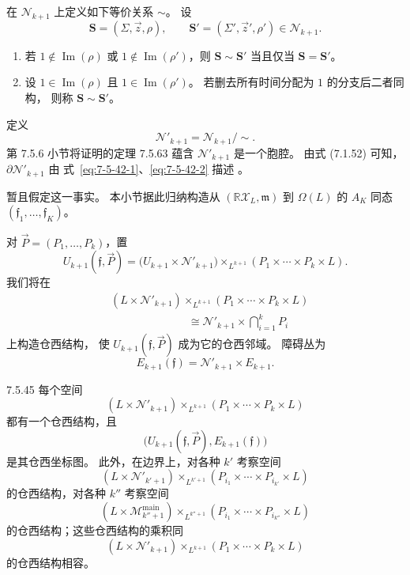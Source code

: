 在 $\mathcal N_{k+1}$ 上定义如下等价关系 $\sim$。
设
\[
\mathbf S=(\Sigma,\vec z,\rho),
\qquad
\mathbf S'=(\Sigma',\vec z',\rho')
\in\mathcal N_{k+1}.
\]
\begin{enumerate}[label=\textup{(7.5.44.\arabic*)},leftmargin=6em]
\item\label{eq:7-5-44-1}
若 $1\notin\operatorname{Im}(\rho)$ 或
$1\notin\operatorname{Im}(\rho')$，则
$\mathbf S\sim\mathbf S'$ 当且仅当
$\mathbf S=\mathbf S'$。
\item\label{eq:7-5-44-2}
设 $1\in\operatorname{Im}(\rho)$ 且
$1\in\operatorname{Im}(\rho')$。
若删去所有时间分配为 $1$ 的分支后二者同构，
则称 $\mathbf S\sim\mathbf S'$。
\end{enumerate}
定义
\[
\mathcal N'_{k+1}=\mathcal N_{k+1}/\!\sim.
\]
第 7.5.6 小节将证明的定理 7.5.63
蕴含 $\mathcal N'_{k+1}$ 是一个胞腔。
由式 (7.1.52) 可知，
$\partial\mathcal N'_{k+1}$ 由
式~\eqref{eq:7-5-42-1}、\eqref{eq:7-5-42-2}
描述
。

暂且假定这一事实。
本小节据此归纳构造从
$(\mathbb R\mathcal X_L,\mathfrak m)$ 到 $\Omega(L)$ 的
$A_K$ 同态
$(\mathfrak f_1,\ldots,\mathfrak f_K)$。

对 $\vec P=(P_1,\ldots,P_k)$，置
\[
U_{k+1}(\mathfrak f,\vec P)
=\bigl(U_{k+1}\times\mathcal N'_{k+1}\bigr)
\mathbin{\times_{L^{k+1}}}
(P_1\times\cdots\times P_k\times L).
\]
我们将在
\[
\begin{aligned}
&(L\times\mathcal N'_{k+1})
\mathbin{\times_{L^{k+1}}}
(P_1\times\cdots\times P_k\times L)\\
&\hspace{7em}\cong
\mathcal N'_{k+1}\times\bigcap_{i=1}^{k}P_i
\end{aligned}
\]
上构造仓西结构，
使 $U_{k+1}(\mathfrak f,\vec P)$ 成为它的仓西邻域。
障碍丛为
\[
E_{k+1}(\mathfrak f)
=\mathcal N'_{k+1}\times E_{k+1}.
\]

\begin{lemma}{7.5.45}\label{lem:7-5-45}
每个空间
\[
(L\times\mathcal N'_{k+1})
\mathbin{\times_{L^{k+1}}}
(P_1\times\cdots\times P_k\times L)
\]
都有一个仓西结构，且
\[
\bigl(U_{k+1}(\mathfrak f,\vec P),
E_{k+1}(\mathfrak f)\bigr)
\]
是其仓西坐标图。
此外，在边界上，对各种 $k'$ 考察空间
\[
(L\times\mathcal N'_{k'+1})
\mathbin{\times_{L^{k'+1}}}
(P_{i_1}\times\cdots\times P_{i_{k'}}\times L)
\]
的仓西结构，对各种 $k''$ 考察空间
\[
(L\times\mathcal M_{k''+1}^{\mathrm{main}})
\mathbin{\times_{L^{k''+1}}}
(P_{i_1}\times\cdots\times P_{i_{k''}}\times L)
\]
的仓西结构；这些仓西结构的乘积同
\[
(L\times\mathcal N'_{k+1})
\mathbin{\times_{L^{k+1}}}
(P_1\times\cdots\times P_k\times L)
\]
的仓西结构相容。
\end{lemma}

